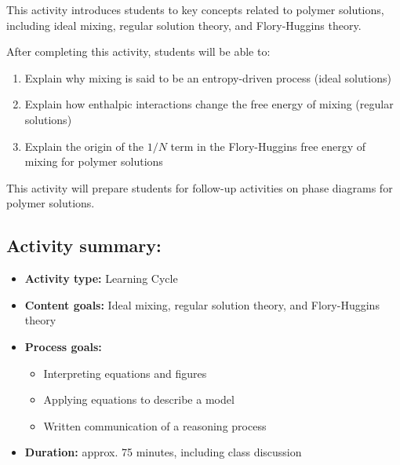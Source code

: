 %
%
%
%

\renewcommand{\figpath}{content/polymphys/solution-thermo/flory-huggins/figs}
\newcommand{\labelbase}{flory-huggins}

\begin{activity}

\begin{instructornotes}

	This activity introduces students to key concepts related to polymer solutions, including ideal mixing, regular solution theory, and Flory-Huggins theory.
	
	After completing this activity, students will be able to:
			\begin{enumerate}
				\item Explain why mixing is said to be an entropy-driven process (ideal solutions)
				\item Explain how enthalpic interactions change the free energy of mixing (regular solutions)
				\item Explain the origin of the $1/N$ term in the Flory-Huggins free energy of mixing for polymer solutions
			\end{enumerate}
	This activity will prepare students for follow-up activities on phase diagrams for polymer solutions.
			
	\subsection*{Activity summary:}
	\begin{itemize}
		\item \textbf{Activity type:} Learning Cycle
		\item \textbf{Content goals:} Ideal mixing, regular solution theory, and Flory-Huggins theory
		\item \textbf{Process goals:} %
			\begin{itemize}
				\item Interpreting equations and figures
				\item Applying equations to describe a model
				\item Written communication of a reasoning process
			\end{itemize}
		\item \textbf{Duration:} approx. 75 minutes, including class discussion
		

\end{itemize}
\end{instructornotes}
\end{activity}
